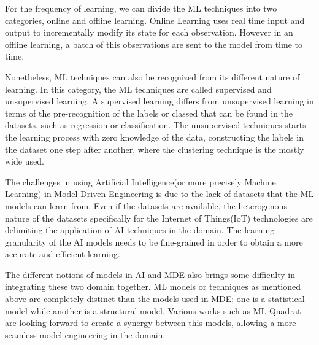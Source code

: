 For the frequency of learning, we can divide the ML techniques into two categories, online and offline learning. Online Learning uses real time input and output to incrementally modify its state for each observation. However in an offline learning, a batch of this observations are sent to the model from time to time.

Nonetheless, ML techniques can also be recognized from its different nature of learning. In this category, the ML techniques are called supervised and unsupervised learning. A supervised learning differs from unsupervised learning in terms of the pre-recognition of the labels or classed that can be found in the datasets, such as regression or classification. The unsupervised techniques starts the learning process with zero knowledge of the data, constructing the labels in the dataset one step after another, where the clustering technique is the mostly wide used. 

The challenges in using Artificial Intelligence(or more precisely Machine Learning) in Model-Driven Engineering is due to the lack of datasets that the ML models can learn from. Even if the datasets are available, the heterogenous nature of the datasets specifically for the Internet of Things(IoT) technologies are delimiting the application of AI techniques in the domain. The learning granularity of the AI models needs to be fine-grained in order to obtain a more accurate and efficient learning.

The different notions of models in AI and MDE also brings some difficulty in integrating these two domain together. ML models or techniques as mentioned above are completely distinct than the models used in MDE; one is a statistical model while another is a structural model. Various works such as ML-Quadrat are looking forward to create a synergy between this models, allowing a more seamless model engineering in the domain.

